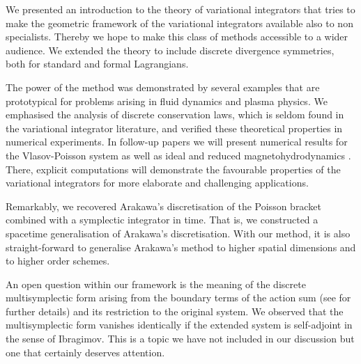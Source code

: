 \documentclass[12pt,a4paper,reqno]{article}
\begin{document}
We presented an introduction to the theory of variational integrators that tries to make the geometric framework of the variational integrators available also to non specialists. Thereby we hope to make this class of methods accessible to a wider audience.
We extended the theory to include discrete divergence symmetries, both for standard and formal Lagrangians.

The power of the method was demonstrated by several examples that are prototypical for problems arising in fluid dynamics and plasma physics. We emphasised the analysis of discrete conservation laws, which is seldom found in the variational integrator literature, and verified these theoretical properties in numerical experiments.
In follow-up papers we will present numerical results for the Vlasov-Poisson system  \cite{KrausMajSonnendruecker:2015} as well as ideal and reduced magnetohydrodynamics \cite{KrausSquireMaj:2015, KrausTassi:2015}. There, explicit computations will demonstrate the favourable properties of the variational integrators for more elaborate and challenging applications.

Remarkably, we recovered Arakawa's discretisation of the Poisson bracket combined with a symplectic integrator in time. That is, we constructed a spacetime generalisation of Arakawa's discretisation. With our method, it is also straight-forward to generalise Arakawa's method to higher spatial dimensions and to higher order schemes.

An open question within our framework is the meaning of the discrete multisymplectic form arising from the boundary terms of the action sum (see \cite{MarsdenPatrick:1998} for further details) and its restriction to the original system. We observed that the multisymplectic form vanishes identically if the extended system is self-adjoint in the sense of Ibragimov. This is a topic we have not included in our discussion but one that certainly deserves attention.
\end{document}
